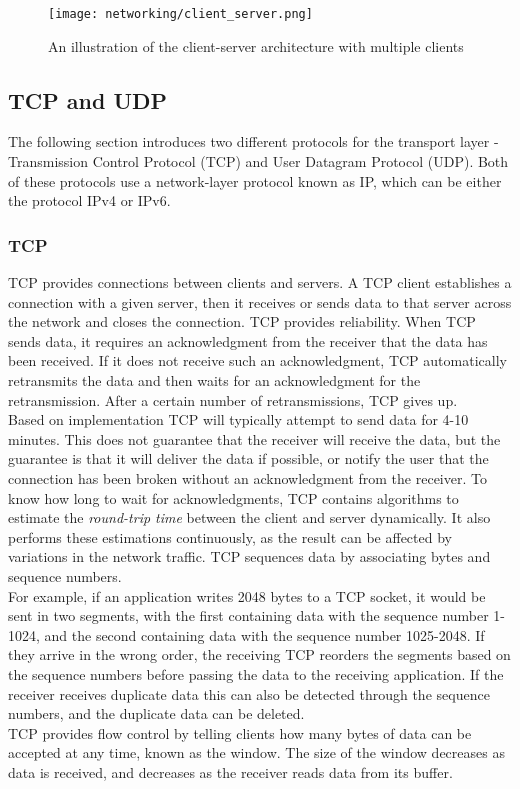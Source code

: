 \begin{figure}[H]
    \centering
    \texttt{[image: networking/client\_server.png]}
    \caption{An illustration of the client-server architecture with multiple clients}
    \label{fig:client-server}
\end{figure}


\subsection{TCP and UDP}\label{sec:tcp-udp}
The following section introduces two different protocols for the transport layer - Transmission Control Protocol (TCP) and User Datagram Protocol (UDP).
Both of these protocols use a network-layer protocol known as IP, which can be either the protocol IPv4 or IPv6.

\subsubsection{TCP}
TCP provides connections between clients and servers.
A TCP client establishes a connection with a given server, then it receives or sends data to that server across the network and closes the connection.
TCP provides reliability.
When TCP sends data, it requires an acknowledgment from the receiver that the data has been received.
If it does not receive such an acknowledgment, TCP automatically retransmits the data and then waits for an acknowledgment for the retransmission.
After a certain number of retransmissions, TCP gives up.\\
Based on implementation TCP will typically attempt to send data for 4-10 minutes.
This does not guarantee that the receiver will receive the data, but the guarantee is that it will deliver the data if possible, or notify the user that the connection has been broken without an acknowledgment from the receiver.
To know how long to wait for acknowledgments, TCP contains algorithms to estimate the \textit{round-trip time} between the client and server dynamically.
It also performs these estimations continuously, as the result can be affected by variations in the network traffic.
TCP sequences data by associating bytes and sequence numbers.\\
For example, if an application writes 2048 bytes to a TCP socket, it would be sent in two segments, with the first containing data with the sequence number 1-1024, and the second containing data with the sequence number 1025-2048.
If they arrive in the wrong order, the receiving TCP reorders the segments based on the sequence numbers before passing the data to the receiving application.
If the receiver receives duplicate data this can also be detected through the sequence numbers, and the duplicate data can be deleted.\\
TCP provides flow control by telling clients how many bytes of data can be accepted at any time, known as the window.
The size of the window decreases as data is received, and decreases as the receiver reads data from its buffer.

